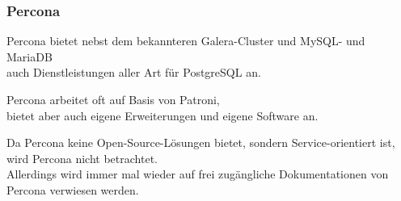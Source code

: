 
\begin{flushleft}
    \subsubsection{Percona}
    Percona bietet nebst dem bekannteren Galera-Cluster und \Gls{MySQL}- und \Gls{MariaDB}\\
    auch Dienstleistungen \cite{WEM9KYAX} aller Art für PostgreSQL an.
\end{flushleft}
\begin{flushleft}
    Percona arbeitet oft auf Basis von Patroni,\\
    bietet aber auch eigene Erweiterungen und eigene Software an\cite{66AS3BU9}.
\end{flushleft}
\begin{flushleft}
    Da Percona keine Open-Source-Lösungen bietet, sondern Service-orientiert ist,\\
    wird Percona nicht betrachtet.\\
    Allerdings wird immer mal wieder auf frei zugängliche Dokumentationen von Percona verwiesen werden.
\end{flushleft}